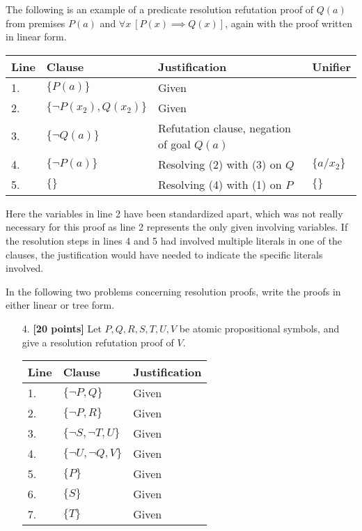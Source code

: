 \documentclass{article}
\begin{document}
The following is an example of a predicate resolution refutation proof
of $Q(a)$ from premises $P(a)$ and $\forall x\ [P(x) \implies Q(x)]$,
again with the proof written in linear form.
\begin{center}
  \begin{tabular}{llll}
    Line & Clause & Justification & Unifier \\ \hline
    1. & $\{ P(a) \}$ & Given & \\
    2. & $\{ \neg P(x_2), Q(x_2) \}$ & Given & \\ \hline
    3. & $\{ \neg Q(a) \}$ & Refutation clause, negation of goal
                             $Q(a)$ & \\
    4. & $\{ \neg P(a) \}$ & Resolving (2) with (3) on $Q$ & $\{ a/x_2
                                                             \}$ \\
    5. & $\{ \}$ & Resolving (4) with (1) on $P$ & $\{ \}$  \\ 
  \end{tabular}
\end{center}
Here the variables in line 2 have been standardized apart, which was
not really necessary for this proof as line 2 represents the only
given involving variables.  If the resolution steps in lines 4 and 5
had involved multiple literals in one of the clauses, the
justification would have needed to indicate the specific literals
involved.

In the following two problems concerning resolution proofs, write the
proofs in either linear or tree form.

\begin{enumerate}
\item[4.] \textbf{[20 points]} Let $P,Q,R,S,T,U,V$ be atomic
  propositional symbols, and give a resolution refutation proof of
  $V$.
  \begin{center}
    \begin{tabular}{lll}
      Line & Clause & Justification \\ \hline
      1. & $\{ \neg P, Q \}$ & Given \\
      2. & $\{ \neg P, R \}$ & Given \\
      3. & $\{ \neg S, \neg T, U \}$ & Given \\
      4. & $\{ \neg U, \neg Q, V \}$ & Given \\
      5. & $\{ P \}$ & Given \\
      6. & $\{ S \}$ & Given \\
      7. & $\{ T \}$ & Given \\ \hline
    \end{tabular}
  \end{center}
\end{enumerate}
\end{document}
